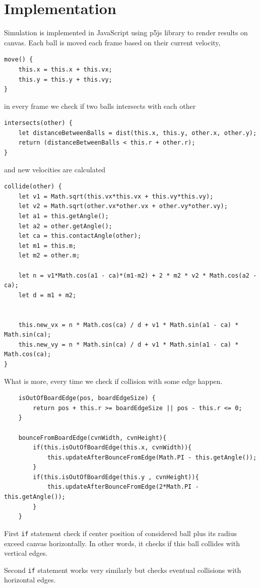 \documentclass[]{report}
\begin{document}
\section{Implementation}
Simulation is implemented in JavaScript using p5js library to render results on canvas. Each ball is moved each frame based on their current velocity,
\begin{lstlisting}
move() {
	this.x = this.x + this.vx;
	this.y = this.y + this.vy;
}
\end{lstlisting}
in every frame we check if two balls intersects with each other
\begin{lstlisting}
intersects(other) {
	let distanceBetweenBalls = dist(this.x, this.y, other.x, other.y);
	return (distanceBetweenBalls < this.r + other.r);
}
\end{lstlisting}
and new velocities are calculated
\begin{lstlisting}
collide(other) {
	let v1 = Math.sqrt(this.vx*this.vx + this.vy*this.vy);
	let v2 = Math.sqrt(other.vx*other.vx + other.vy*other.vy);
	let a1 = this.getAngle();
	let a2 = other.getAngle();
	let ca = this.contactAngle(other);
	let m1 = this.m;
	let m2 = other.m;
	
	let n = v1*Math.cos(a1 - ca)*(m1-m2) + 2 * m2 * v2 * Math.cos(a2 - ca);
	let d = m1 + m2;
	
	
	this.new_vx = n * Math.cos(ca) / d + v1 * Math.sin(a1 - ca) * Math.sin(ca);
	this.new_vy = n * Math.sin(ca) / d + v1 * Math.sin(a1 - ca) * Math.cos(ca);
}
\end{lstlisting}
\newpage
What is more, every time we check if collision with some edge happen.
\begin{lstlisting}
    isOutOfBoardEdge(pos, boardEdgeSize) {
        return pos + this.r >= boardEdgeSize || pos - this.r <= 0;
    }

    bounceFromBoardEdge(cvnWidth, cvnHeight){
        if(this.isOutOfBoardEdge(this.x, cvnWidth)){
            this.updateAfterBounceFromEdge(Math.PI - this.getAngle());
        }
        if(this.isOutOfBoardEdge(this.y , cvnHeight)){
            this.updateAfterBounceFromEdge(2*Math.PI - this.getAngle());
        }
    }
\end{lstlisting}

First \verb!if! statement check if center position of considered ball plus its radius exceed canvas horizontally. In other words, it checks if this ball collides with vertical edges. 
 
Second \verb!if! statement works very similarly but checks eventual collisions with horizontal edges.
\end{document}
